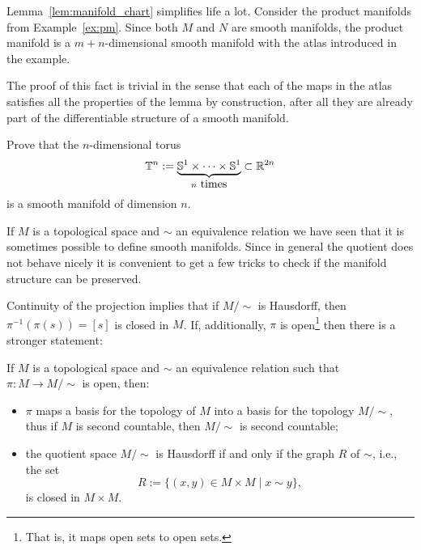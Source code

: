 \begin{example}
  Lemma~\ref{lem:manifold_chart} simplifies life a lot.
  Consider the product manifolds from Example~\ref{ex:pm}.
  Since both $M$ and $N$ are smooth manifolds, the product manifold is a $m+n$-dimensional smooth manifold with the atlas introduced in the example.
  
  The proof of this fact is trivial in the sense that each of the maps in the atlas satisfies all the properties of the lemma by construction, after all they are already part of the differentiable structure of a smooth manifold.
\end{example}

\begin{exercise}
  Prove that the $n$-dimensional torus
  \begin{equation}
    \bT^n := \LaTeXunderbrace{\bS^1\times\cdots\times\bS^1}_{n\mbox{ times}} \subset \R^{2n}
  \end{equation}
  is a smooth manifold of dimension $n$.
\end{exercise}

If $M$ is a topological space and $\sim$ an equivalence relation we have seen that it is sometimes possible to define smooth manifolds.
Since in general the quotient does not behave nicely it is convenient to get a few tricks to check if the manifold structure can be preserved.

Continuity of the projection implies that if $M/\sim$ is Hausdorff, then $\pi^{-1}(\pi(s)) = [s]$ is closed in $M$.
If, additionally, $\pi$ is open\footnote{That is, it maps open sets to open sets.} then there is a stronger statement:
\begin{theorem}\label{thm:openproj}
  If $M$ is a topological space and $\sim$ an equivalence relation such that $\pi:M \to M/\sim$ is open, then:
  \begin{itemize}
    \item $\pi$ maps a basis for the topology of $M$ into a basis for the topology $M/\sim$, thus if $M$ is second countable, then $M/\sim$ is second countable;
    \item the quotient space $M/\sim$ is Hausdorff if and only if the graph $R$ of $\sim$, i.e., the set
    \begin{equation}
      R := \{(x,y)\in M\times M \mid x\sim y\},
    \end{equation}
    is closed in $M\times M$.
  \end{itemize}
\end{theorem}

